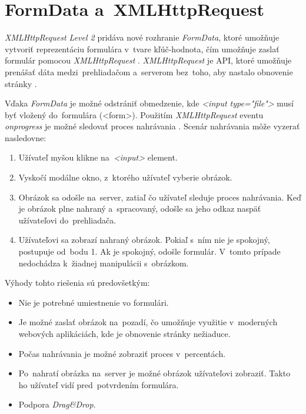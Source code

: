 \section{FormData a~XMLHttpRequest}

\emph{XMLHttpRequest Level 2} pridáva nové rozhranie \emph{FormData}, ktoré umožňuje vytvoriť reprezentáciu formulára v~tvare kľúč-hodnota, čím umožňuje zaslať formulár pomocou \emph{XMLHttpRequest} \cite{MDN_Formdata}. \emph{XMLHttpRequest} je API, ktoré umožňuje prenášať dáta medzi~prehliadačom a~serverom bez~toho, aby nastalo obnovenie stránky \cite{MDN_XMLHttpRequest}.

Vďaka \emph{FormData} je možné odstrániť obmedzenie, kde \emph{<input type="file"\textgreater} musí byť vložený do~formulára (<form\textgreater). Použitím \emph{XMLHttpRequest} eventu \emph{onprogress} je možné sledovať proces nahrávania \cite{MDN_XMLHttpRequest_progress}. Scenár nahrávania môže vyzerať nasledovne:
\begin{enumerate}
	\item Užívateľ myšou klikne na~\emph{<input>} element.
	\item Vyskočí modálne okno, z~ktorého užívateľ vyberie obrázok.
	\item Obrázok sa odošle na~server, zatiaľ čo užívateľ sleduje proces nahrávania. Keď je obrázok plne nahraný a~spracovaný, odošle sa jeho odkaz naspäť užívateľovi do~prehliadača.
	\item Užívateľovi sa zobrazí nahraný obrázok. Pokiaľ s~ním nie je spokojný, postupuje od~bodu 1. Ak je spokojný, odošle formulár. V~tomto prípade nedochádza k~žiadnej manipulácii s~obrázkom.
\end{enumerate}

Výhody tohto riešenia sú predovšetkým:
\begin{itemize}
	\item Nie je potrebné umiestnenie vo formulári.
	\item Je možné zaslať obrázok na~pozadí, čo umožňuje využitie v~moderných webových aplikáciách, kde je obnovenie stránky nežiaduce.
	\item Počas nahrávania je možné zobraziť proces v~percentách.
	\item Po~nahratí obrázka na~server je možné obrázok užívateľovi zobraziť. Takto ho užívateľ vidí pred~potvrdením formulára.
	\item Podpora \emph{Drag\&Drop}.
\end{itemize}

